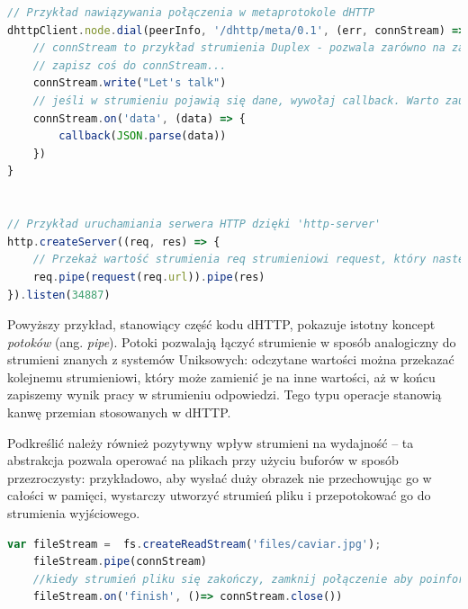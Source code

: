 \begin{lstlisting}[language=javascript]
// Przykład nawiązywania połączenia w metaprotokole dHTTP
dhttpClient.node.dial(peerInfo, '/dhttp/meta/0.1', (err, connStream) => {
    // connStream to przykład strumienia Duplex - pozwala zarówno na zapis, jak i odczyt.
    // zapisz coś do connStream...
    connStream.write("Let's talk")
    // jeśli w strumieniu pojawią się dane, wywołaj callback. Warto zauważyć, że to wywołanie może nastąpić zarówno przed, jak i po zawołaniu write -- zależy od stanu strumienia, który może otrzymywać dane w innych miejscach programu
    connStream.on('data', (data) => {
        callback(JSON.parse(data))
    })
}


// Przykład uruchamiania serwera HTTP dzięki 'http-server'
http.createServer((req, res) => {
    // Przekaż wartość strumienia req strumieniowi request, który następnie zostanie przekazany do res. W efekcie zadziałamy jako najprostsze proxy - otrzymamy dane o oryginalnym zapytaniu, wywołamy je z punktu widzenia serwera, i przekażemy wynik w ramach odpowiedzi.
    req.pipe(request(req.url)).pipe(res)
}).listen(34887)
\end{lstlisting}

Powyższy przykład, stanowiący część kodu dHTTP, pokazuje istotny koncept {\em potoków} (ang. {\em pipe}). Potoki pozwalają łączyć strumienie w sposób analogiczny do strumieni znanych z systemów Uniksowych: odczytane wartości można przekazać kolejnemu strumieniowi, który może zamienić je na inne wartości, aż w końcu zapiszemy wynik pracy w strumieniu odpowiedzi. Tego typu operacje stanowią kanwę przemian stosowanych w dHTTP.

Podkreślić należy również pozytywny wpływ strumieni na wydajność -- ta abstrakcja pozwala operować na plikach przy użyciu buforów w sposób przezroczysty: przykładowo, aby wysłać duży obrazek nie przechowując go w całości w pamięci, wystarczy utworzyć strumień pliku i przepotokować go do strumienia wyjściowego.

\begin{lstlisting}[language=javascript]
    var fileStream =  fs.createReadStream('files/caviar.jpg');
    fileStream.pipe(connStream)
    //kiedy strumień pliku się zakończy, zamknij połączenie aby poinformować odbiorcę, że nic już na niego nie czeka
    fileStream.on('finish', ()=> connStream.close())
\end{lstlisting}



